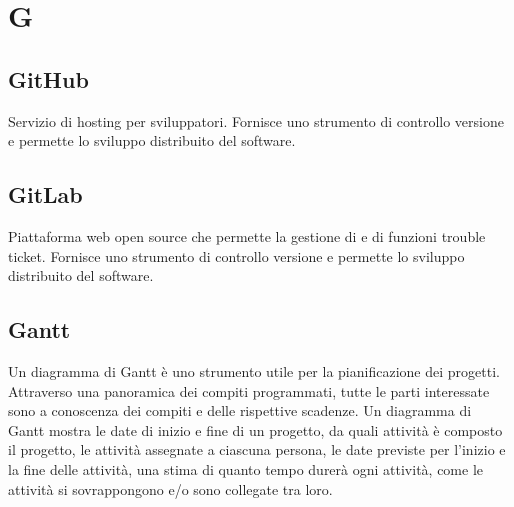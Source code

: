 \section*{G}
\markright{}

\subsection*{GitHub}
Servizio di hosting per sviluppatori. Fornisce uno strumento di controllo versione e permette lo sviluppo distribuito del software.

\subsection*{GitLab}
Piattaforma web open source che permette la gestione di   e di funzioni trouble ticket. Fornisce uno strumento di controllo versione e permette lo sviluppo distribuito del software.

\subsection*{Gantt}
Un diagramma di Gantt è uno strumento utile per la pianificazione dei progetti. Attraverso una panoramica dei compiti programmati, tutte le parti interessate sono a conoscenza dei compiti e delle rispettive scadenze. Un diagramma di Gantt mostra le date di inizio e fine di un progetto, da quali attività è composto il progetto, le attività assegnate a ciascuna persona, le date previste per l'inizio e la fine delle attività, una stima di quanto tempo durerà ogni attività, come le attività si sovrappongono e/o sono collegate tra loro.
